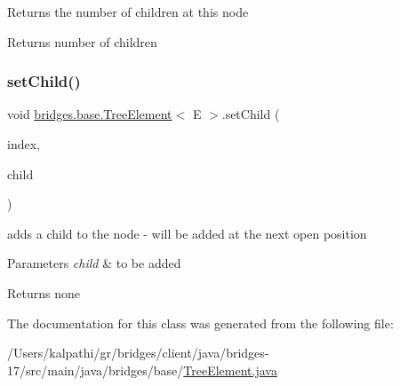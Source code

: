 Returns the number of children at this node

\begin{DoxyReturn}{Returns}
number of children 
\end{DoxyReturn}
\mbox{\label{classbridges_1_1base_1_1_tree_element_aefafebb19d64398d150e464e4361ddf0}} 
\subsubsection{\texorpdfstring{set\+Child()}{setChild()}}
{\footnotesize\ttfamily void \mbox{\hyperlink{classbridges_1_1base_1_1_tree_element}{bridges.\+base.\+Tree\+Element}}$<$ E $>$.set\+Child (\begin{DoxyParamCaption}\item[{int}]{index,  }\item[{\mbox{\hyperlink{classbridges_1_1base_1_1_tree_element}{Tree\+Element}}$<$ E $>$}]{child }\end{DoxyParamCaption})}

adds a child to the node -\/ will be added at the next open position


\begin{DoxyParams}{Parameters}
{\em child} & to be added\\
\hline
\end{DoxyParams}
\begin{DoxyReturn}{Returns}
none 
\end{DoxyReturn}


The documentation for this class was generated from the following file\+:\begin{DoxyCompactItemize}
\item 
/\+Users/kalpathi/gr/bridges/client/java/bridges-\/17/src/main/java/bridges/base/\mbox{\hyperlink{_tree_element_8java}{Tree\+Element.\+java}}\end{DoxyCompactItemize}
